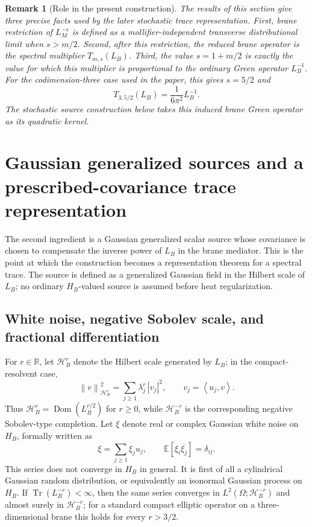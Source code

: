 \documentclass[11pt]{article}
\newtheorem{remark}[theorem]{Remark}
\newcommand{\R}{\mathbb{R}}
\newcommand{\E}{\mathbb{E}}
\newcommand{\Tr}{\operatorname{Tr}}
\newcommand{\Dom}{\operatorname{Dom}}
\newcommand{\braket}[2]{\left\langle #1,#2\right\rangle}
\newcommand{\norm}[1]{\left\lVert #1\right\rVert}
\begin{document}
\begin{remark}[Role in the present construction]
The results of this section give three precise facts used by the later
stochastic trace representation.  First, brane restriction of
\(L_M^{-s}\) is defined as a mollifier-independent transverse distributional
limit when \(s>m/2\).  Second, after this restriction, the reduced brane
operator is the spectral multiplier \(T_{m,s}(L_B)\).  Third, the value
\(s=1+m/2\) is exactly the value for which this multiplier is proportional
to the ordinary Green operator \(L_B^{-1}\).  For the codimension-three
case used in the paper, this gives \(s=5/2\) and
\[
    T_{3,5/2}(L_B)=\frac{1}{6\pi^2}L_B^{-1}.
\]
The stochastic source construction below takes this induced brane Green
operator as its quadratic kernel.
\end{remark}

\section{Gaussian generalized sources and a prescribed-covariance trace representation}
\label{sec:stochastic}

The second ingredient is a Gaussian generalized scalar source whose covariance is chosen to compensate the inverse power of $L_B$ in the brane mediator.  This is the point at which the construction becomes a representation theorem for a spectral trace.  The source is defined as a generalized Gaussian field in the Hilbert scale of $L_B$; no ordinary $H_B$-valued source is assumed before heat regularization.

\subsection{White noise, negative Sobolev scale, and fractional differentiation}

For $r\in\R$, let $\mathcal H_B^r$ denote the Hilbert scale generated by $L_B$; in the compact-resolvent case,
\[
    \norm{v}_{\mathcal H_B^r}^2
    =\sum_{j\geq1}\lambda_j^r\,|v_j|^2,
    \qquad
    v_j=\braket{u_j}{v}.
\]
Thus $\mathcal H_B^r=\Dom(L_B^{r/2})$ for $r\geq0$, while $\mathcal H_B^{-r}$ is the corresponding negative Sobolev-type completion.  Let $\xi$ denote real or complex Gaussian white noise on $H_B$, formally written as
\begin{equation}
    \xi=\sum_{j\geq1}\xi_j u_j,
    \qquad
    \E[\xi_i\overline{\xi_j}]=\delta_{ij}.
    \label{eq:white-noise-expansion}
\end{equation}
This series does not converge in $H_B$ in general.  It is first of all a cylindrical Gaussian random distribution, or equivalently an isonormal Gaussian process on $H_B$.  If $\Tr(L_B^{-r})<\infty$, then the same series converges in $L^2(\Omega;\mathcal H_B^{-r})$ and almost surely in $\mathcal H_B^{-r}$; for a standard compact elliptic operator on a three-dimensional brane this holds for every $r>3/2$.
\end{document}
